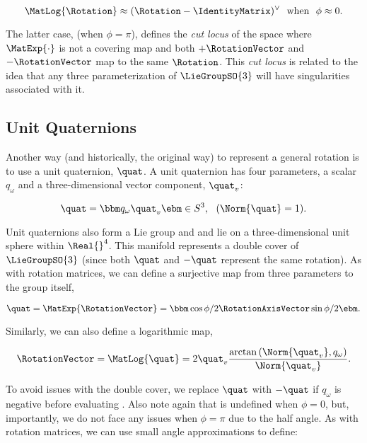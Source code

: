 \begin{equation}
	\MatLog{\Rotation} \approx (\Rotation - \IdentityMatrix)^\vee ~~ \textrm{when} ~~ \phi \approx 0. 
\end{equation}

The latter case, (when $\phi = \pi$), defines the \textit{cut locus} of the space where $\MatExp{\cdot}$ is not a covering map and both $+\RotationVector$ and $-\RotationVector$ map to the same $\Rotation$. This \textit{cut locus} is related to the idea that any three parameterization of $\LieGroupSO{3}$ will have singularities associated with it.

\subsection{Unit Quaternions}

Another way (and historically, the original way) to represent a general rotation is to use a unit quaternion, $\quat$. A unit quaternion has four parameters, a scalar $q_\omega$ and a three-dimensional vector component, $\quat_v$:

\begin{equation}
	\quat = \bbm q_\omega \\ \quat_v \ebm \in S^3, ~~ (\Norm{\quat} = 1).
\end{equation}

Unit quaternions also form a Lie group \citep{Sola2018-kg} and and lie on a three-dimensional unit sphere within $\Real{}^4$. This manifold represents a double cover of $\LieGroupSO{3}$ (since both $\quat$ and $-\quat$ represent the same rotation). As with rotation matrices, we can define a surjective map from three parameters to the group itself,

\begin{equation}
\quat = \MatExp{\RotationVector} = \bbm \cos{\phi/2} \\ \RotationAxisVector \sin{\phi/2} \ebm.	
\end{equation}

Similarly, we can also define a logarithmic map,

\begin{align}
\label{eq:math_quat_log}
	\RotationVector =  \MatLog{\quat} = 2 \quat_v \frac{\arctan{(\Norm{\quat_v},  q_\omega})}{\Norm{\quat_v}}.
\end{align}

To avoid issues with the double cover, we replace $\quat$ with $-\quat$ if $q_\omega$ is negative before evaluating . Also note again that  is undefined when $\phi = 0$, but, importantly, we do not face any issues when $\phi = \pi$ due to the half angle. As with rotation matrices, we can use small angle approximations to define:

